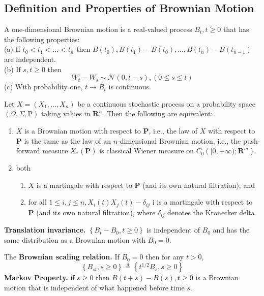 
\subsection{Definition and Properties of Brownian Motion}
\begin{definition}
	A one-dimensional Brownian motion is a real-valued process $B_t, t \geq 0$ that has the following properties:\\
(a) If $t_0<t_1<\ldots<t_n$ then $B\left(t_0\right), B\left(t_1\right)-B\left(t_0\right), \ldots, B\left(t_n\right)-B\left(t_{n-1}\right)$ are independent.\\
(b) If $s, t \geq 0$ then
\[
W_t-W_s \sim \mathcal{N}(0, t-s),(0 \leq s \leq t)
\]
(c) With probability one, $t \rightarrow B_t$ is continuous.
\end{definition}

\begin{theorem}
	Let $X=\left(X_1, \ldots, X_n\right)$ be a continuous stochastic process on a probability space $(\Omega, \Sigma, \mathrm{P})$ taking values in $\mathbf{R}^n$. Then the following are equivalent:
\begin{enumerate}
		\item 
$X$ is a Brownian motion with respect to $\mathbf{P}$, i.e., the law of $X$ with respect to $\mathbf{P}$ is the same as the law of an $n$-dimensional Brownian motion, i.e., the push-forward measure $X_*(\mathbf{P})$ is classical Wiener measure on $C_0\left([0,+\infty) ; \mathbf{R}^m\right)$.
\item 
 both
\begin{enumerate}
 	\item 
$X$ is a martingale with respect to $\mathbf{P}$ (and its own natural filtration); and
 	\item 
for all $1 \leq i, j \leq n, X_i(t) X_j(t)-\delta_{i j}$ i is a martingale with respect to $\mathbf{P}$ (and its own natural filtration), where $\delta_{i j}$ denotes the Kronecker delta.
	\end{enumerate}
\end{enumerate}
\end{theorem}

\textbf{Translation invariance.} $\left\{B_t-B_0, t \geq 0\right\}$ is independent of $B_0$ and has the same distribution as a Brownian motion with $B_0=0$.

The \textbf{Brownian scaling relation.} If $B_0=0$ then for any $t>0$,
\[
\left\{B_{s t}, s \geq 0\right\} \stackrel{d}{=}\left\{t^{1 / 2} B_s, s \geq 0\right\}
\]
\textbf{Markov Property.} if $s \geq 0$ then $B(t+s)-B(s), t \geq 0$ is a Brownian motion that is independent of what happened before time $s$.

